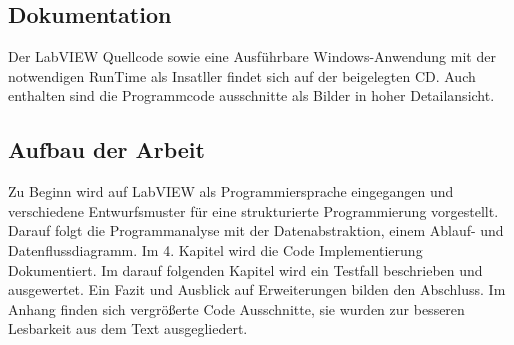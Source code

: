 
\subsection{Dokumentation}
Der LabVIEW Quellcode  sowie eine Ausführbare Windows-Anwendung mit der notwendigen RunTime als Insatller findet sich auf der beigelegten CD.
Auch enthalten sind die Programmcode ausschnitte als Bilder in hoher Detailansicht.


\subsection{Aufbau der Arbeit}

Zu Beginn wird auf LabVIEW als Programmiersprache eingegangen und verschiedene Entwurfsmuster für eine strukturierte Programmierung vorgestellt. Darauf folgt die Programmanalyse mit der Datenabstraktion, einem Ablauf-  und Datenflussdiagramm. Im 4. Kapitel wird die Code Implementierung Dokumentiert. Im darauf folgenden Kapitel wird ein Testfall beschrieben und ausgewertet. Ein Fazit und Ausblick auf Erweiterungen bilden den Abschluss. Im Anhang finden sich vergrößerte Code Ausschnitte, sie wurden zur besseren Lesbarkeit aus dem Text ausgegliedert.




